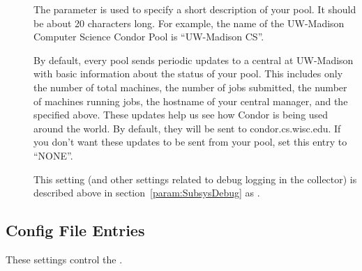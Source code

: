 \begin{description}
\item[] \label{param:CollectorName}
  The parameter is used to specify a short description of your pool.
  It should be about 20 characters long.  For example, the name of the
  UW-Madison Computer Science Condor Pool is ``UW-Madison CS''.  

\item[]
  \label{param:CondorDevelopersCollector} By default, every pool sends
  periodic updates to a central  at UW-Madison with
  basic information about the status of your pool.  This includes only
  the number of total machines, the number of jobs submitted, the
  number of machines running jobs, the hostname of your central
  manager, and the  specified above.  These
  updates help us see how Condor is being used around the world.  By
  default, they will be sent to condor.cs.wisc.edu.  If you don't want
  these updates to be sent from your pool, set this entry to
  ``NONE''. 

\item[] \label{param:CollectorDebug} This setting
  (and other settings related to debug logging in the collector) is
  described above in section~\ref{param:SubsysDebug} as
  .

\end{description}

\subsection{ Config File Entries}
\label{sec:Negotiator-Config-File-Entries}

These settings control the .

